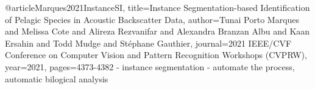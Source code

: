     
    
    
    
    
    
    
    
    
    
    
    
    
    
    
 
 
 

    @article{Marques2021InstanceSI,
  title={Instance Segmentation-based Identification of Pelagic Species in Acoustic Backscatter Data},
  author={Tunai Porto Marques and Melissa Cote and Alireza Rezvanifar and Alexandra Branzan Albu and Kaan Ersahin and Todd Mudge and St{\'e}phane Gauthier},
  journal={2021 IEEE/CVF Conference on Computer Vision and Pattern Recognition Workshops (CVPRW)},
  year={2021},
  pages={4373-4382}
}
- instance segmentation
- automate the process, automatic bilogical analysis

